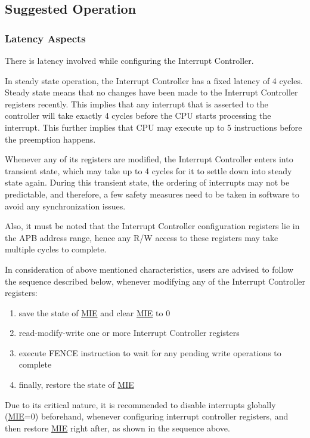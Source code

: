 \documentclass[main\_\_EN.tex]{subfiles}
\begin{document}
\subsection{Suggested Operation}
\label{sec:riscvcpu-int-suggest-op}

\subsubsection{Latency Aspects}
\label{sec:riscvcpu-int-latency}

There is latency involved while configuring the Interrupt Controller.

In steady state operation, the Interrupt Controller has a fixed latency of 4 cycles. Steady state means that no changes have been made to the Interrupt Controller registers recently. This implies that any interrupt that is asserted to the controller will take exactly 4 cycles before the CPU starts processing the interrupt. This further implies that CPU may execute up to 5 instructions before the preemption happens.

Whenever any of its registers are modified, the Interrupt Controller enters into transient state, which may take up to 4 cycles for it to settle down into steady state again. During this transient state, the ordering of interrupts may not be predictable, and therefore, a few safety measures need to be taken in software to avoid any synchronization issues.

Also, it must be noted that the Interrupt Controller configuration registers lie in the APB address range, hence any R/W access to these registers may take multiple cycles to complete.

In consideration of above mentioned characteristics, users are advised to follow the sequence described below, whenever modifying any of the Interrupt Controller registers:
\begin{enumerate}
    \item save the state of \hyperref[fielddesc:MSTATUSMIE]{MIE} and clear \hyperref[fielddesc:MSTATUSMIE]{MIE} to 0
    \item read-modify-write one or more Interrupt Controller registers
    \item execute FENCE instruction to wait for any pending write operations to complete
    \item finally, restore the state of \hyperref[fielddesc:MSTATUSMIE]{MIE}
\end{enumerate}

Due to its critical nature, it is recommended to disable interrupts globally (\hyperref[fielddesc:MSTATUSMIE]{MIE}=0) beforehand, whenever configuring interrupt controller registers, and then restore \hyperref[fielddesc:MSTATUSMIE]{MIE} right after, as shown in the sequence above.
\end{document}

